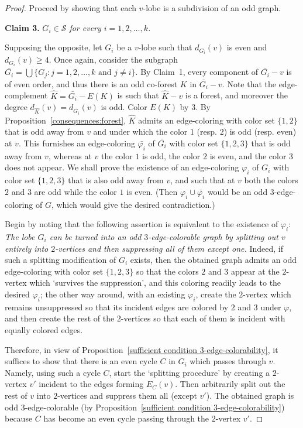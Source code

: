 \documentclass[a4paper,12pt]{article}
\numberwithin{equation}{section}
\begin{document}
\begin{proof}
\bigskip

Proceed by showing that each $v$-lobe is a subdivision of an odd graph.

\bigskip

\noindent \textbf{Claim 3.} \textit{$G_i\in \mathcal{S}$ for every $i=1,2,\ldots,k$.}

\medskip

\noindent Supposing the opposite, let $G_i$ be a $v$-lobe such that $d_{G_i}(v)$ is even and $d_{G_i}(v)\geq4$. Once again, consider the subgraph $\bar{G_i}=\bigcup\{G_j:j=1,2,\ldots,k \text { and } j\neq i\}$. By Claim~1, every component of $\bar{G_i}-v$ is of even order, and thus there is an odd co-forest $K$ in $\bar{G_i}-v$. Note that the edge-complement $\hat{K}=\bar{G_i}-E(K)$ is such that $\hat{K}-v$ is a forest, and moreover the degree $d_{\hat{K}}(v)=d_{\bar{G_i}}(v)$ is odd. Color $E(K)$ by $3$. By Proposition~\ref{consequences:forest},  $\hat{K}$ admits an edge-coloring with color set $\{1,2\}$ that is odd away from $v$ and under which the color $1$ (resp. $2$) is odd (resp. even) at $v$. This furnishes an edge-coloring $\bar{\varphi_i}$ of $\bar{G_i}$ with color set $\{1,2,3\}$ that is odd away from $v$, whereas at $v$ the color $1$ is odd, the color $2$ is even, and the color $3$ does not appear. We shall prove the existence of an edge-coloring $\varphi_i$ of $G_i$ with color set $\{1,2,3\}$ that is also odd away from $v$, and such that at $v$ both the colors $2$ and $3$ are odd while the color $1$ is even. (Then  $\varphi_i\cup\bar{\varphi_i}$ would be an odd $3$-edge-coloring of $G$, which would give the desired contradiction.)

Begin by noting that the following assertion is equivalent to the existence of $\varphi_i$: \textit{The lobe $G_i$ can be turned into an odd $3$-edge-colorable graph by splitting out $v$ entirely into $2$-vertices and then suppressing all of them except one.} Indeed, if such a splitting modification of $G_i$ exists, then the obtained graph admits an odd edge-coloring with color set $\{1,2,3\}$ so that the colors $2$ and $3$ appear at the $2$-vertex which `survives the suppression', and this coloring readily leads to the desired $\varphi_i$; the other way around, with an existing $\varphi_i$, create the $2$-vertex which remains unsuppressed so that its incident edges are colored by $2$ and $3$ under $\varphi$, and then create the rest of the $2$-vertices so that each of them is incident with equally colored edges.

Therefore, in view of Proposition~\ref{sufficient condition 3-edge-colorability}, it suffices to show that there is an even cycle $C$ in $G_i$ which passes through $v$. Namely, using such a cycle $C$, start the `splitting procedure' by creating a $2$-vertex $v'$ incident to the edges forming $E_C(v)$. Then arbitrarily split out the rest of $v$ into $2$-vertices and suppress them all (except $v'$). The obtained graph is odd $3$-edge-colorable (by Proposition~\ref{sufficient condition 3-edge-colorability}) because $C$ has become an even cycle passing through the $2$-vertex $v'$.


\end{proof}
\end{document}

